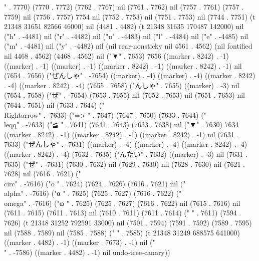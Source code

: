 " . 7770) (7770 . 7772) (7762 . 7767) nil (7761 . 7762) nil (7757 . 7761) (7757 . 7759) nil (7756 . 7757) 7754 nil (7752 . 7753) nil (7751 . 7753) nil (7744 . 7751) (t 21348 31651 82566 46000) nil (4481 . 4482) (t 21348 31635 170487 142000) nil ("h" . -4481) nil ("r" . -4482) nil ("u" . -4483) nil ("l" . -4484) nil ("e" . -4485) nil ("m" . -4481) nil ("y" . -4482) nil (nil rear-nonsticky nil 4561 . 4562) (nil fontified nil 4468 . 4562) (4468 . 4562) nil ("▼" . 7653) 7656 ((marker . 8242) . -1) ((marker) . -1) ((marker) . -1) ((marker . 8242) . -1) ((marker . 8242) . -1) nil (7654 . 7656) ("ぜんしゃ" . -7654) ((marker) . -4) ((marker) . -4) ((marker . 8242) . -4) ((marker . 8242) . -4) (7655 . 7658) ("んしゃ" . 7655) ((marker) . -3) nil (7654 . 7658) ("ぜ" . -7654) (7653 . 7655) nil (7652 . 7653) nil (7651 . 7653) nil (7644 . 7651) nil (7633 . 7644) ("\\Rightarrow" . -7633) ("=>
" . 7647) (7647 . 7650) (7633 . 7644) ("\\leqq" . -7633) ("≦
" . 7641) (7641 . 7643) (7633 . 7638) nil ("▼" . 7630) 7634 ((marker . 8242) . -1) ((marker . 8242) . -1) ((marker . 8242) . -1) nil (7631 . 7633) ("ぜんしゃ" . -7631) ((marker) . -4) ((marker) . -4) ((marker . 8242) . -4) ((marker . 8242) . -4) (7632 . 7635) ("んたい" . 7632) ((marker) . -3) nil (7631 . 7635) ("ぜ" . -7631) (7630 . 7632) nil (7629 . 7630) nil (7628 . 7630) nil (7621 . 7628) nil (7616 . 7621) ("\\circ" . -7616) ("o
" . 7624) (7624 . 7626) (7616 . 7621) nil ("\\alpha" . -7616) ("α
" . 7625) (7625 . 7627) (7616 . 7622) ("\\omega" . -7616) ("ω
" . 7625) (7625 . 7627) (7616 . 7622) nil (7615 . 7616) nil (7611 . 7615) (7611 . 7613) nil (7610 . 7611) (7611 . 7614) ("    " . 7611) (7594 . 7626) (t 21348 31252 792591 33000) nil (7591 . 7594) (7591 . 7592) (7589 . 7595) nil (7588 . 7589) nil (7585 . 7588) (" " . 7585) (t 21348 31249 688575 641000) ((marker . 4482) . -1) ((marker . 7673) . -1) nil ("\\" . -7586) ((marker . 4482) . -1) nil undo-tree-canary))
